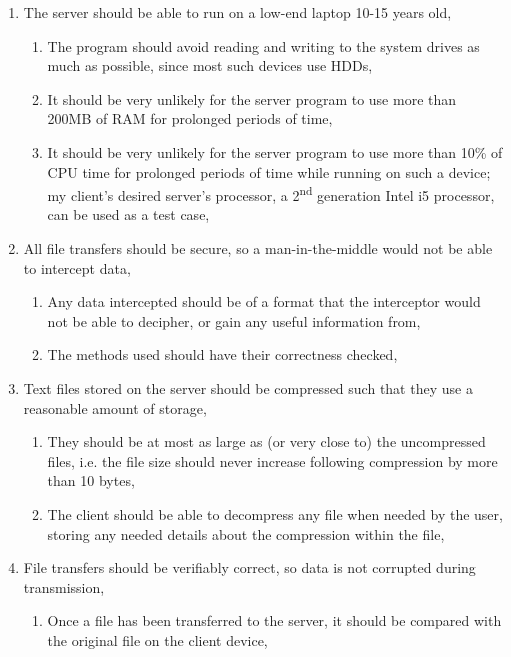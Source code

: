 \documentclass[../main.tex]{subfiles}
\begin{document}
\begin{enumerate}
\begin{enumerate}
        \item There should be no graphical interface, 
    \end{enumerate}
    \item The server should be able to run on a low-end laptop 10-15 years old, 
    \begin{enumerate}
        \item The program should avoid reading and writing to the system drives as much as possible, since most such devices use HDDs, 
        \item It should be very unlikely for the server program to use more than 200MB of RAM for prolonged periods of time,
        \item It should be very unlikely for the server program to use more than 10\% of CPU time for prolonged periods of time while running on such a device; my client's desired server's processor, a 2\textsuperscript{nd} generation Intel i5 processor, can be used as a test case, 
    \end{enumerate}
    \item All file transfers should be secure, so a man-in-the-middle would not be able to intercept data,
    \begin{enumerate}
        \item Any data intercepted should be of a format that the interceptor would not be able to decipher, or gain any useful information from, 
        \item The methods used should have their correctness checked,
    \end{enumerate}
    \item Text files stored on the server should be compressed such that they use a reasonable amount of storage, 
    \begin{enumerate}
        \item They should be at most as large as (or very close to) the uncompressed files, i.e. the file size should never increase following compression by more than 10 bytes,
        \item The client should be able to decompress any file when needed by the user, storing any needed details about the compression within the file, 
    \end{enumerate}
    \item File transfers should be verifiably correct, so data is not corrupted during transmission,
    \begin{enumerate}
        \item Once a file has been transferred to the server, it should be compared with the original file on the client device, 

\end{enumerate}
\end{enumerate}
\end{document}
